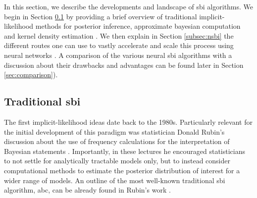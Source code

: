 In this section, we describe the developments and landscape of \gls*{sbi} algorithms. We begin in Section \ref{subsec:abc} by providing a brief overview of traditional implicit-likelihood methods for posterior inference, approximate bayesian computation \cite{Sisson:2018aa} and kernel density estimation \cite{diggle1984monte}. We then explain in Section \ref{subsec:nsbi} the different routes one can use to vastly accelerate and scale this process using neural networks \cite{Cranmer:2019eaq, Lueckmann:2021aa}. A comparison of the various neural \gls*{sbi} algorithms with a discussion about their drawbacks and advantages can be found later in Section \ref{sec:comparison}). 


\subsection{Traditional \gls*{sbi}}  \label{subsec:abc}

The first implicit-likelihood ideas date back to the 1980s. Particularly relevant for the initial development of this paradigm was statistician Donald Rubin's discussion about the use of frequency calculations for the interpretation of Bayesian statements \cite{rubin1984bayesianly}. Importantly, in these lectures he encouraged statisticians to not settle for analytically tractable models only, but to instead consider computational methods to estimate the posterior distribution of interest for a wider range of models. An outline of the most well-known traditional \gls*{sbi} algorithm, \gls*{abc}, can be already found in Rubin's work \cite[Section 3.1]{rubin1984bayesianly}. 

